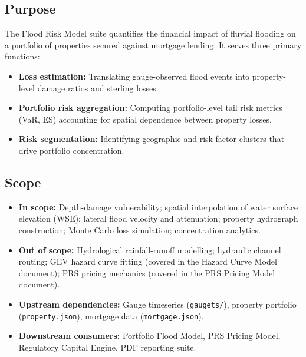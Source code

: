 \documentclass[11pt,a4paper]{article}
\begin{document}
\subsection{Purpose}
The Flood Risk Model suite quantifies the financial impact of fluvial flooding on a
portfolio of properties secured against mortgage lending. It serves three primary functions:

\begin{itemize}[nosep]
    \item \textbf{Loss estimation:} Translating gauge-observed flood events into
          property-level damage ratios and sterling losses.
    \item \textbf{Portfolio risk aggregation:} Computing portfolio-level tail risk metrics
          (VaR, ES) accounting for spatial dependence between property losses.
    \item \textbf{Risk segmentation:} Identifying geographic and risk-factor clusters that
          drive portfolio concentration.
\end{itemize}

\subsection{Scope}
\begin{itemize}[nosep]
    \item \textbf{In scope:} Depth-damage vulnerability; spatial interpolation of water
          surface elevation (WSE); lateral flood velocity and attenuation; property
          hydrograph construction; Monte Carlo loss simulation; concentration analytics.
    \item \textbf{Out of scope:} Hydrological rainfall-runoff modelling; hydraulic channel
          routing; GEV hazard curve fitting (covered in the Hazard Curve Model document);
          PRS pricing mechanics (covered in the PRS Pricing Model document).
    \item \textbf{Upstream dependencies:} Gauge timeseries (\texttt{gaugets/}), property
          portfolio (\texttt{property.json}), mortgage data (\texttt{mortgage.json}).
    \item \textbf{Downstream consumers:} Portfolio Flood Model, PRS Pricing Model,
          Regulatory Capital Engine, PDF reporting suite.
\end{itemize}

\mkmframework
\end{document}
